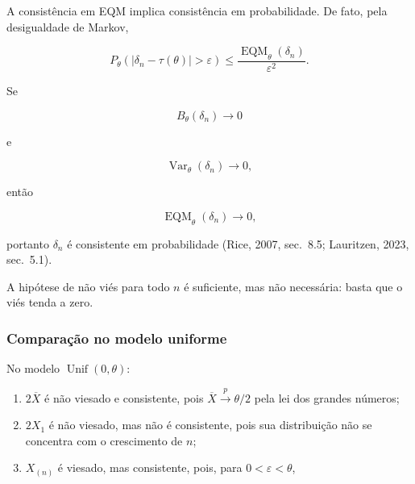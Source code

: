\documentclass[
  letterpaper,
  DIV=11,
  numbers=noendperiod]{scrreprt}
\providecommand{\tightlist}{%
  \setlength{\itemsep}{0pt}\setlength{\parskip}{0pt}}\usepackage{longtable,booktabs,array}
\begin{document}
A consistência em EQM implica consistência em probabilidade. De fato,
pela desigualdade de Markov,

\[P_\theta\left(
|\delta_n-\tau(\theta)|>\varepsilon
\right)
\leq
\frac{\operatorname{EQM}_\theta(\delta_n)}{\varepsilon^2}.\]

\begin{tcolorbox}[enhanced jigsaw, colback=white, leftrule=.75mm, colbacktitle=quarto-callout-important-color!10!white, breakable, titlerule=0mm, bottomtitle=1mm, title=\textcolor{quarto-callout-important-color}{\faExclamation}\hspace{0.5em}{Critério suficiente para consistência}, colframe=quarto-callout-important-color-frame, toprule=.15mm, opacityback=0, bottomrule=.15mm, opacitybacktitle=0.6, arc=.35mm, toptitle=1mm, rightrule=.15mm, coltitle=black, left=2mm]

Se

\[B_\theta(\delta_n)\longrightarrow 0\]

e

\[\operatorname{Var}_\theta(\delta_n)\longrightarrow 0,\]

então

\[\operatorname{EQM}_\theta(\delta_n)\longrightarrow 0,\]

portanto \(\delta_n\) é consistente em probabilidade (Rice, 2007,
sec.~8.5; Lauritzen, 2023, sec.~5.1).

\end{tcolorbox}

A hipótese de não viés para todo \(n\) é suficiente, mas não necessária:
basta que o viés tenda a zero.

\subsubsection*{Comparação no modelo
uniforme}\label{comparauxe7uxe3o-no-modelo-uniforme}

No modelo \(\operatorname{Unif}(0,\theta)\):

\begin{enumerate}
\def\labelenumi{\arabic{enumi}.}
\tightlist
\item
  \(2\overline{X}\) é não viesado e consistente, pois
  \(\overline{X}\xrightarrow{p}\theta/2\) pela lei dos grandes números;
\item
  \(2X_1\) é não viesado, mas não é consistente, pois sua distribuição
  não se concentra com o crescimento de \(n\);
\item
  \(X_{(n)}\) é viesado, mas consistente, pois, para
  \(0<\varepsilon<\theta\),
\end{enumerate}
\end{document}
